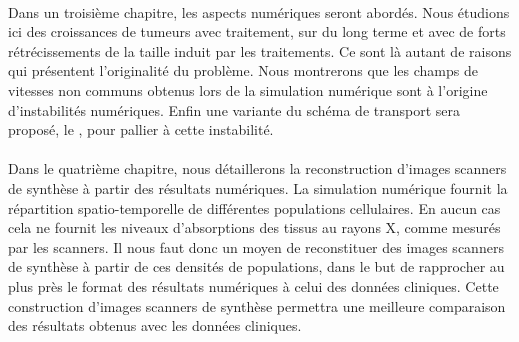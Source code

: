 \documentclass[main.tex]{subfiles}
\begin{document}
\paragraph{}
Dans un troisième chapitre, les aspects numériques seront abordés. 
Nous étudions ici des croissances de tumeurs avec traitement, sur du long terme et avec de forts rétrécissements de la taille induit par les traitements. Ce sont là autant de raisons qui présentent l'originalité du problème. Nous montrerons que les champs de vitesses non communs obtenus lors de la simulation numérique  sont à l'origine d'instabilités numériques. 
Enfin une variante du schéma de transport sera proposé, le \twinweno, pour pallier à cette instabilité.

\paragraph{}
Dans le quatrième chapitre, nous détaillerons la reconstruction %
d'images scanners de synthèse à partir des résultats numériques. La simulation numérique fournit la répartition spatio-temporelle de différentes populations cellulaires. En aucun cas cela ne fournit les niveaux d'absorptions des tissus au rayons X, comme mesurés par les scanners. Il nous faut donc un moyen de reconstituer des images scanners de synthèse à partir de ces densités de populations, dans le but de rapprocher au plus près %
le format des résultats numériques à celui des données cliniques.
Cette construction d'images scanners de synthèse permettra une meilleure comparaison des résultats obtenus avec les données cliniques. 
\end{document}
